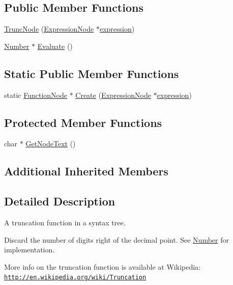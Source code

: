 \subsection*{Public Member Functions}
\begin{DoxyCompactItemize}
\item 
\hyperlink{classTruncNode_a32e8df2efc73ec374f93e3b60fd8c756}{Trunc\+Node} (\hyperlink{classExpressionNode}{Expression\+Node} $\ast$\hyperlink{classFunctionNode_ad7577b179a1937aaf8a0058bb5b546dc}{expression})
\item 
\hyperlink{structNumber}{Number} $\ast$ \hyperlink{classTruncNode_a6d999ff093e9e92e3aa288b04ba99fb2}{Evaluate} ()
\end{DoxyCompactItemize}
\subsection*{Static Public Member Functions}
\begin{DoxyCompactItemize}
\item 
static \hyperlink{classFunctionNode}{Function\+Node} $\ast$ \hyperlink{classTruncNode_ac3abdd88221a6ced88a01bd95eff258e}{Create} (\hyperlink{classExpressionNode}{Expression\+Node} $\ast$\hyperlink{classFunctionNode_ad7577b179a1937aaf8a0058bb5b546dc}{expression})
\end{DoxyCompactItemize}
\subsection*{Protected Member Functions}
\begin{DoxyCompactItemize}
\item 
char $\ast$ \hyperlink{classTruncNode_ad19cef55faa2ef0e83d6288d4de5230e}{Get\+Node\+Text} ()
\end{DoxyCompactItemize}
\subsection*{Additional Inherited Members}


\subsection{Detailed Description}
A truncation function in a syntax tree. 

Discard the number of digits right of the decimal point. See \hyperlink{structNumber}{Number} for implementation.

More info on the truncation function is available at Wikipedia\+: \href{http://en.wikipedia.org/wiki/Truncation}{\tt http\+://en.\+wikipedia.\+org/wiki/\+Truncation} 

